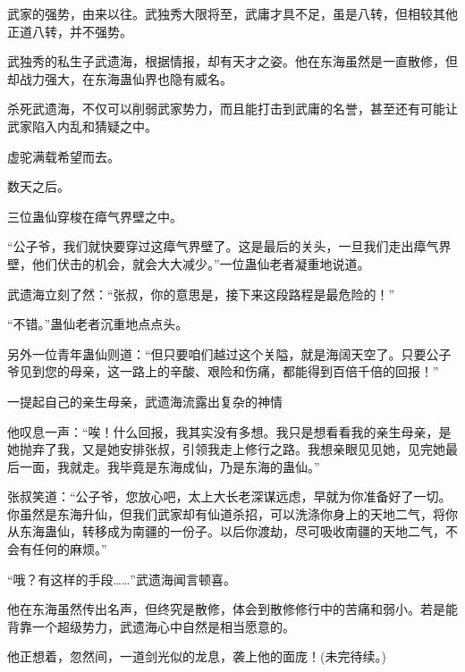 \begin{this_body}
武家的强势，由来以往。武独秀大限将至，武庸才具不足，虽是八转，但相较其他正道八转，并不强势。

武独秀的私生子武遗海，根据情报，却有天才之姿。他在东海虽然是一直散修，但却战力强大，在东海蛊仙界也隐有威名。

杀死武遗海，不仅可以削弱武家势力，而且能打击到武庸的名誉，甚至还有可能让武家陷入内乱和猜疑之中。

虚驼满载希望而去。

数天之后。

三位蛊仙穿梭在瘴气界壁之中。

“公子爷，我们就快要穿过这瘴气界壁了。这是最后的关头，一旦我们走出瘴气界壁，他们伏击的机会，就会大大减少。”一位蛊仙老者凝重地说道。

武遗海立刻了然：“张叔，你的意思是，接下来这段路程是最危险的！”

“不错。”蛊仙老者沉重地点点头。

另外一位青年蛊仙则道：“但只要咱们越过这个关隘，就是海阔天空了。只要公子爷见到您的母亲，这一路上的辛酸、艰险和伤痛，都能得到百倍千倍的回报！”

一提起自己的亲生母亲，武遗海流露出复杂的神情

他叹息一声：“唉！什么回报，我其实没有多想。我只是想看看我的亲生母亲，是她抛弃了我，又是她安排张叔，引领我走上修行之路。我想亲眼见见她，见完她最后一面，我就走。我毕竟是东海成仙，乃是东海的蛊仙。”

张叔笑道：“公子爷，您放心吧，太上大长老深谋远虑，早就为你准备好了一切。你虽然是东海升仙，但我们武家却有仙道杀招，可以洗涤你身上的天地二气，将你从东海蛊仙，转移成为南疆的一份子。以后你渡劫，尽可吸收南疆的天地二气，不会有任何的麻烦。”

“哦？有这样的手段……”武遗海闻言顿喜。

他在东海虽然传出名声，但终究是散修，体会到散修修行中的苦痛和弱小。若是能背靠一个超级势力，武遗海心中自然是相当愿意的。

他正想着，忽然间，一道剑光似的龙息，袭上他的面庞！(未完待续。)

\end{this_body}

